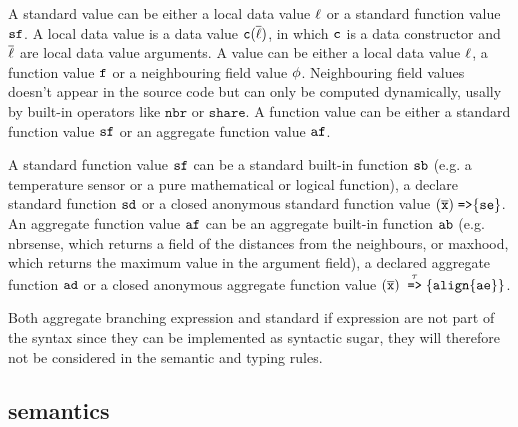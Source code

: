 A standard value can be either a local data value $\ell$ or a standard function value $\mathtt{sf}$. A local data value is a data value $\mathtt{c}(\overline{\ell})$, in which $\mathtt{c}$ is a data constructor and $\overline{\ell}$ are local data value arguments. A value can be either a local data value $\ell$, a function value $\mathtt{f}$ or a neighbouring field value $\phi$. Neighbouring field values doesn't appear in the source code but can only be computed dynamically, usally by built-in operators like $\mathtt{nbr}$ or $\mathtt{share}$. A function value can be either a standard function value $\mathtt{sf}$ or an aggregate function value $\mathtt{af}$.

A standard function value $\mathtt{sf}$ can be a standard built-in function $\mathtt{sb}$ (e.g. a temperature sensor or a pure mathematical or logical function), a declare standard function $\mathtt{sd}$ or a closed anonymous standard function value $(\overline{\mathtt{x}}) \; \mathrm{ \texttt{=>}\{ } \mathtt{se} \}$. An aggregate function value $\mathtt{af}$ can be an aggregate built-in function $\mathtt{ab}$ (e.g. nbrsense, which returns a field of the distances from the neighbours, or maxhood, which returns the maximum value in the argument field), a declared aggregate function $\mathtt{ad}$ or a closed anonymous aggregate function value $ (\overline{\mathtt{x}}) \; \stackrel{\tau}{\mathrm{\texttt{=>}}}{\{\mathtt{align}\{\mathtt{ae}\}\}}$.

Both aggregate branching expression and standard if expression are not part of the syntax since they can be implemented as syntactic sugar, they will therefore not be considered in the semantic and typing rules.

\subsection{\FKotac{} semantics}

